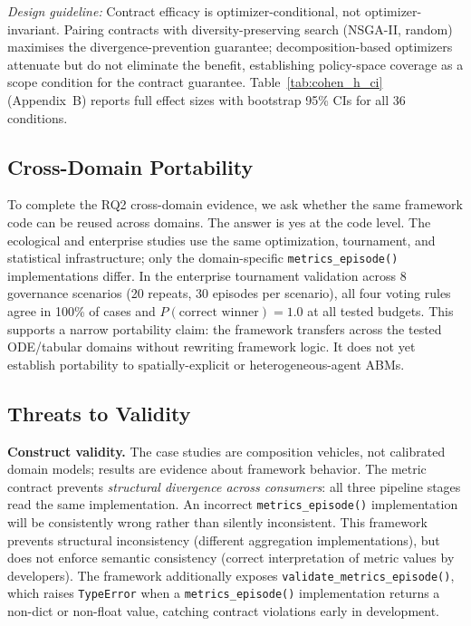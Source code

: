 \documentclass{wscpaperproc}
\begin{document}
\emph{Design guideline:} Contract efficacy is optimizer-conditional, not
optimizer-invariant. Pairing contracts with diversity-preserving search (NSGA-II,
random) maximises the divergence-prevention guarantee; decomposition-based optimizers
attenuate but do not eliminate the benefit, establishing policy-space coverage as
a scope condition for the contract guarantee. Table~\ref{tab:cohen_h_ci} (Appendix~B)
reports full effect sizes with bootstrap 95\% CIs for all 36 conditions.



\subsection{Cross-Domain Portability}
\label{sec:crossdomain}

To complete the RQ2 cross-domain evidence, we ask whether the same framework
code can be reused across domains. The answer is yes at the code level. The ecological and
enterprise studies use the same optimization, tournament, and statistical
infrastructure; only the domain-specific \texttt{metrics\_episode()}
implementations differ. In the enterprise tournament validation across 8
governance scenarios (20 repeats, 30 episodes per scenario), all four voting
rules agree in 100\% of cases and $P(\text{correct winner})\!=\!1.0$ at all
tested budgets. This supports a narrow portability claim: the framework
transfers across the tested ODE/tabular domains without rewriting framework
logic. It does not yet establish portability to spatially-explicit or
heterogeneous-agent ABMs.

\subsection{Threats to Validity}

\textbf{Construct validity.} The case studies are composition vehicles, not
calibrated domain models; results are evidence about framework behavior. The
metric contract prevents \emph{structural divergence across consumers}: all
three pipeline stages read the same implementation. An incorrect \texttt{metrics\_episode()}
implementation will be consistently wrong rather than silently inconsistent. This framework prevents structural inconsistency (different aggregation implementations), but does not enforce semantic consistency (correct interpretation of metric values by developers). The
framework additionally exposes \texttt{validate\_metrics\_episode()}, which raises
\texttt{TypeError} when a \texttt{metrics\_episode()} implementation returns a
non-dict or non-float value, catching contract violations early in development.
\end{document}
